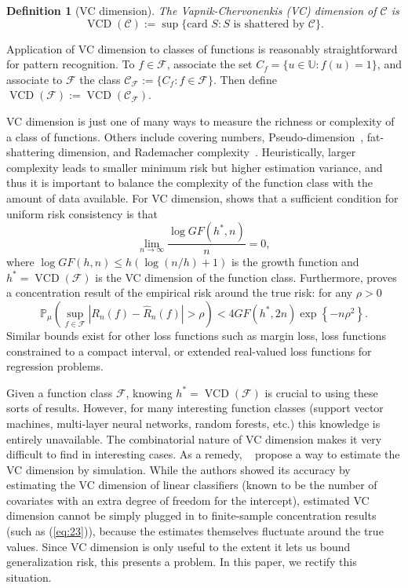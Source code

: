 \documentclass[11pt]{article}
\newtheorem{definition}[theorem]{Definition}
\newcommand{\F}{\mathcal{F}}
\renewcommand{\P}{\mathbb{P}}
\renewcommand{\eqref}[1]{(\ref{eq:#1})}
\DeclareMathOperator*{\vcd}{VCD}
\renewcommand{\hat}[1]{\widehat{#1}}
\begin{document}
\begin{definition}
  [VC dimension] The \emph{Vapnik-Chervonenkis (VC) dimension} of $\mathcal{C}$
  is
  \begin{equation*}
    \vcd(\mathcal{C}) := \sup \{ \mbox{card } S : S\mbox{ is shattered by
    } \mathcal{C} \}.
  \end{equation*}
\end{definition}

Application of VC dimension to classes of functions is reasonably
straightforward for pattern recognition. To $f\in\F$, associate the set $C_f =
\{ u \in \mathbb{U} : f(u)=1\}$, and associate to $\F$ the class
$\mathcal{C}_\F := \{ C_f : f \in \F\}$. Then define $\vcd{(\F)} :=
\vcd{(\mathcal{C}_\F)}$.

VC dimension is just one of many ways to measure the richness or complexity of
a class of functions.  Others include covering numbers,
Pseudo-dimension~\citep{Pollard1984}, fat-shattering dimension, and Rademacher
complexity~\citep{BartlettMendelson2002}. Heuristically, larger complexity
leads to smaller minimum risk but higher estimation variance, and thus it is
important to balance the complexity of the function class with the amount of
data available.  For VC dimension, \citet{Vapnik2000} shows that a sufficient
condition for uniform risk consistency is that
\begin{equation*}
  \label{eq:22}
  \lim_{n\rightarrow\infty} \frac{\log{GF(h^*,n)}}{n} = 0,
\end{equation*}
where $\log{GF(h,n)}\leq h(\log{(n/h)+1})$ is the growth function and $h^*=\vcd
(\F)$ is the VC dimension of the function class. Furthermore,
\citet{Vapnik1998,Vapnik2000} proves a concentration result of the empirical
risk around the true risk: for any $\rho>0$
\begin{equation}
  \label{eq:23}
    \P_\mu \left( \sup_{f \in \F} \left|R_n(f) - \hat{R}_n(f)\right| >
      \rho\right) < 4 GF(h^*,2n) \exp\left\{-n\rho^2\right\}.
\end{equation}
Similar bounds exist for other loss functions such as margin loss, loss
functions constrained to a compact interval, or extended real-valued loss
functions for regression problems.

Given a function class $\F$, knowing $h^*=\vcd (\F)$ is crucial to using these
sorts of results. However, for many interesting function classes (support
vector machines, multi-layer neural networks, random forests, etc.) this
knowledge is entirely unavailable. The combinatorial nature of VC dimension
makes it very difficult to find in interesting cases. As a remedy,
~\citet{VapnikLevin1994} propose a way to estimate the VC dimension by
simulation. While the authors showed its accuracy by estimating the VC
dimension of linear classifiers (known to be the number of covariates with an
extra degree of freedom for the intercept), estimated VC dimension cannot be
simply plugged in to finite-sample concentration results (such as \eqref{23}),
because the estimates themselves fluctuate around the true values.  Since VC
dimension is only useful to the extent it lets us bound generalization risk,
this presents a problem.  In this paper, we rectify this situation.
\end{document}
